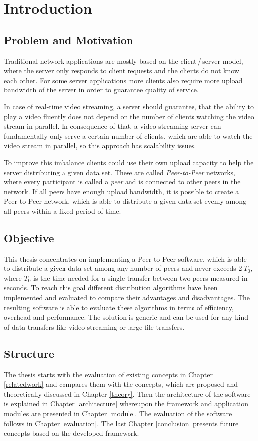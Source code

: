 \chapter{Introduction}
\section{Problem and Motivation}
Traditional network applications are mostly based on the client\,/\,server model, where the server only responds to client requests and the clients do not know each other. 
For some server applications more clients also require more upload bandwidth of the server in order to guarantee quality of service.

In case of real-time video streaming, a server should guarantee, that the ability to play a video fluently does not depend on the number of clients watching the video stream in parallel. In consequence of that, a video streaming server can fundamentally only serve a certain number of clients, which are able to watch the video stream in parallel, so this approach has scalability issues.

To improve this imbalance clients could use their own upload capacity to help the server distributing a given data set. These are called \emph{Peer-to-Peer} networks, where every participant is called a \emph{peer} and is connected to other peers in the network.  If all peers have enough upload bandwidth, it is possible to create a Peer-to-Peer network, which is able to distribute a given data set evenly among all peers within a fixed period of time.

\section{Objective}
This thesis concentrates on implementing a Peer-to-Peer software, which is able to distribute a given data set among any number of peers and never exceeds $2\:T_0$, where $T_0$ is the time needed for a single transfer between two peers measured in seconds. To reach this goal different distribution algorithms have been implemented and evaluated to compare their advantages and disadvantages. The resulting software is able to evaluate these algorithms in terms of efficiency, overhead and performance. The solution is generic and can be used for any kind of data transfers like video streaming or large file transfers.

\section{Structure}
The thesis starts with the evaluation of existing concepts in Chapter \ref{relatedwork} and compares them with the concepts, which are proposed and theoretically discussed in Chapter \ref{theory}. Then the architecture of the software is explained in Chapter \ref{architecture} whereupon the framework and application modules are presented in Chapter \ref{module}. The evaluation of the software follows in Chapter \ref{evaluation}. The last Chapter \ref{conclusion} presents future concepts based on the developed framework.